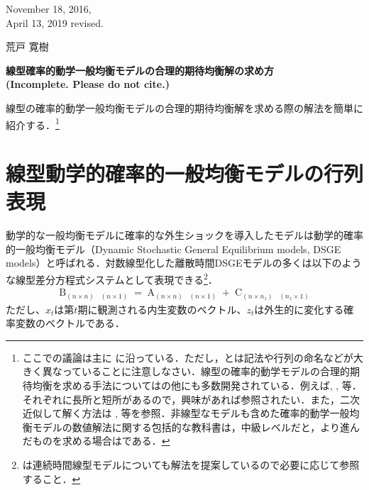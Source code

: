 \documentclass[a4j, dvipdfmx]{jarticle}
\begin{document}
\begin{flushright}
November 18, 2016,\\
April 13, 2019 revised.

荒戸 寛樹
\end{flushright}
\begin{center}
\Large{\textbf{
線型確率的動学一般均衡モデルの合理的期待均衡解の求め方 \\ (Incomplete. Please do not cite.)
}}
\end{center}
\vspace{10pt}
線型の確率的動学一般均衡モデルの合理的期待均衡解を求める際の解法を簡単に紹介する．\footnote{ここでの議論は主に\citet{klein2000} に沿っている．ただし，\citet{klein2000}とは記法や行列の命名などが大きく異なっていることに注意しなさい．線型の確率的動学モデルの合理的期待均衡を求める手法については\citet{klein2000}の他にも多数開発されている．例えば\citet{blanc1980}, \citet{uhlig1999}, \citet{sims2002}等．それぞれに長所と短所があるので，興味があれば参照されたい．また，二次近似して解く方法は \citet{schmi2004}, \citet{kim2008}等を参照．非線型なモデルも含めた確率的動学一般均衡モデルの数値解法に関する包括的な教科書は，中級レベルだと\citet{mccan2008:abcs}，より進んだものを求める場合は\citet{heer2009}である．}
\section{線型動学的確率的一般均衡モデルの行列表現}
動学的な一般均衡モデルに確率的な外生ショックを導入したモデルは動学的確率的一般均衡モデル（Dynamic Stochastic General Equilibrium models, DSGE models）と呼ばれる．対数線型化した離散時間DSGEモデルの多くは以下のような線型差分方程式システムとして表現できる\footnote{\citet{sims2002}は連続時間線型モデルについても解法を提案しているので必要に応じて参照すること．}．
\begin{align}
\mathop{B}_{(n \times n)} \mathop{E_tx_{t+1}}_{(n \times 1)} = \mathop{A}_{(n\times n)} \mathop{x_t}_{(n\times 1)} + \mathop{C}_{(n \times n_z)} \mathop{z_t}_{(n_z \times 1)} \label{model}
\end{align}
ただし、$x_t$は第$t$期に観測される内生変数のベクトル、$z_t$は外生的に変化する確率変数のベクトルである．
\end{document}
